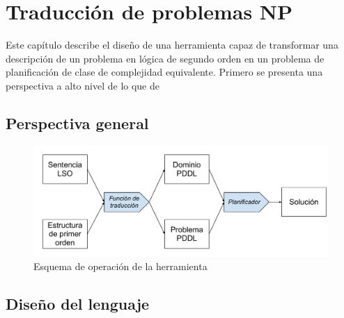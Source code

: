 
\chapter{Traducción de problemas NP}
\label{Chapter2}
Este capítulo describe el diseño de una herramienta capaz de transformar una
descripción de un problema en lógica de segundo orden 
en un problema de planificación de clase de complejidad equivalente. 
Primero se presenta una perspectiva a alto nivel de lo que de

\section{Perspectiva general}
\begin{figure}[h!]
\centering
\includegraphics[width=\textwidth]{figuras/esquema_herramienta.pdf}
\caption{Esquema de operación de la herramienta}
\label{esquema_herramienta}
\end{figure}

\section{Diseño del lenguaje}

